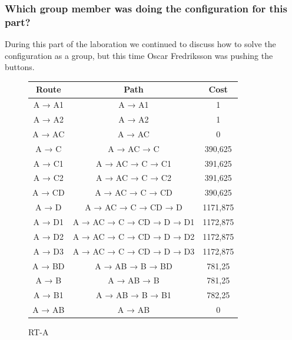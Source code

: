 \documentclass[a4paper, titlepage,12pt]{article}
\begin{document}
		\subsubsection{Which group member was doing the configuration for this part?}

		During this part of the laboration we continued to discuss how to solve the configuration as a group, but this time Oscar Fredriksson was pushing the buttons. 

		\begin{figure}
			\begin{center}
			\begin{tabular}{|c|c|c|}
				\hline
Route & Path & Cost \\ 
				\hline
A → A1 & A → A1 & 1 \\ 
				\hline
A → A2 & A → A2 & 1 \\ 
				\hline
A → AC & A → AC & 0 \\ 
				\hline
A → C & A → AC → C & 390,625 \\ 
				\hline
A → C1 & A → AC → C → C1 & 391,625 \\ 
				\hline
A → C2 & A → AC → C → C2 & 391,625 \\ 
				\hline
A → CD & A → AC → C → CD & 390,625 \\ 
				\hline
A → D & A → AC → C → CD → D & 1171,875 \\ 
				\hline
A → D1 & A → AC → C → CD → D → D1 & 1172,875 \\ 
				\hline
A → D2 & A → AC → C → CD → D → D2 & 1172,875 \\ 
				\hline
A → D3 & A → AC → C → CD → D → D3 & 1172,875 \\ 
				\hline
A → BD & A → AB → B → BD & 781,25 \\ 
				\hline
A → B & A → AB → B & 781,25 \\ 
				\hline
A → B1 & A → AB → B → B1 & 782,25 \\ 
				\hline
A → AB & A → AB & 0 \\ 
				\hline
				\end{tabular}
				\caption{RT-A}
			\end{center}
		\end{figure}
\end{document}
